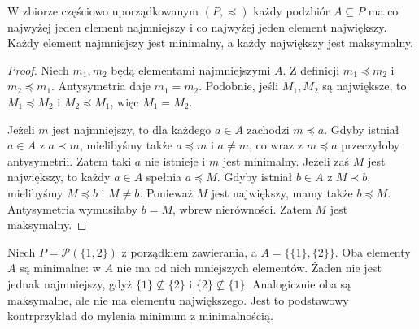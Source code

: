 \begin{twierdzenie}
\label{thm:order-least-unique}
W zbiorze częściowo uporządkowanym $(P,\preceq)$ każdy
podzbiór $A\subseteq P$ ma co najwyżej jeden element
najmniejszy i co najwyżej jeden element największy.
Każdy element najmniejszy jest minimalny, a każdy
największy jest maksymalny.
\end{twierdzenie}
\begin{proof}
Niech $m_1,m_2$ będą elementami najmniejszymi $A$.
Z definicji $m_1\preceq m_2$ i $m_2\preceq m_1$.
Antysymetria daje $m_1=m_2$. Podobnie, jeśli
$M_1,M_2$ są największe, to $M_1\preceq M_2$ i
$M_2\preceq M_1$, więc $M_1=M_2$.

Jeżeli $m$ jest najmniejszy, to dla każdego $a\in A$
zachodzi $m\preceq a$. Gdyby istniał $a\in A$ z
$a\prec m$, mielibyśmy także $a\preceq m$ i $a\ne m$,
co wraz z $m\preceq a$ przeczyłoby antysymetrii.
Zatem taki $a$ nie istnieje i $m$ jest minimalny.
Jeżeli zaś $M$ jest największy, to każdy $a\in A$ spełnia
$a\preceq M$. Gdyby istniał $b\in A$ z $M\prec b$,
mielibyśmy $M\preceq b$ i $M\ne b$. Ponieważ $M$ jest największy,
mamy także $b\preceq M$. Antysymetria wymusiłaby $b=M$,
wbrew nierówności. Zatem $M$ jest maksymalny.
\end{proof}

\begin{przyklad}
Niech $P=\mathcal P(\{1,2\})$ z porządkiem zawierania,
a $A=\{\{1\},\{2\}\}$. Oba elementy $A$ są minimalne:
w $A$ nie ma od nich mniejszych elementów. Żaden nie jest
jednak najmniejszy, gdyż $\{1\}\nsubseteq\{2\}$
i $\{2\}\nsubseteq\{1\}$. Analogicznie oba są
maksymalne, ale nie ma elementu największego.
Jest to podstawowy kontrprzykład do mylenia minimum z
minimalnością.
\end{przyklad}

